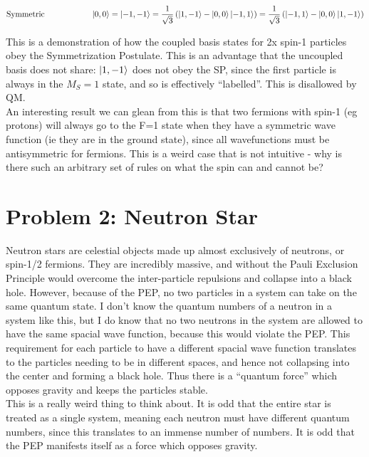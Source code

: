 \documentclass[10pt]{article} %
\begin{document}
\begin{align*}
  \mbox{Symmetric}\hspace{2cm} &\ket{0,0} = \ket{-1,-1} =
  \frac{1}{\sqrt{3}}\left(\ket{1,-1} - \ket{0,0} \ket{-1,1}\right)
  = \frac{1}{\sqrt{3}}\left(\ket{-1,1} - \ket{0,0} \ket{1,-1}\right)\\
\end{align*}

This is a demonstration of how the coupled basis states for 2x spin-1 particles
obey the Symmetrization Postulate. This is an advantage that the uncoupled basis
does not share: $\ket{1,-1}$ does not obey the SP, since the first particle is always
in the $M_S = 1$ state, and so is effectively ``labelled''. This is disallowed
by QM.\\

An interesting result we can glean from this is that two fermions with
spin-1 (eg protons) will always go to the F=1 state when they have a symmetric
wave function (ie they are in the ground state), since all wavefunctions must be
antisymmetric for fermions. This is a weird case that is not intuitive - why is
there such an arbitrary set of rules on what the spin can and cannot be?\\

\section{Problem 2: Neutron Star}
Neutron stars are celestial objects made up almost exclusively of neutrons, or spin-1/2 fermions.
They are incredibly massive, and without the Pauli Exclusion Principle would overcome the
inter-particle repulsions and collapse into a black hole. However, because of the PEP, no two
particles in a system can take on the same quantum state. I don't know the quantum numbers of
a neutron in a system like this, but I do know that no two neutrons in the system are allowed to
have the same spacial wave function, because this would violate the PEP. This requirement for each
particle to have a different spacial wave function translates to the particles needing to be in
different spaces, and hence not collapsing into the center and forming a black hole. Thus there
is a ``quantum force'' which opposes gravity and keeps the particles stable.\\

This is a really weird thing to think about. It is odd that the entire star is treated as a single
system, meaning each neutron must have different quantum numbers, since this translates to an
immense number of numbers. It is odd that the PEP manifests itself as a force which opposes gravity.
\\
\end{document}
